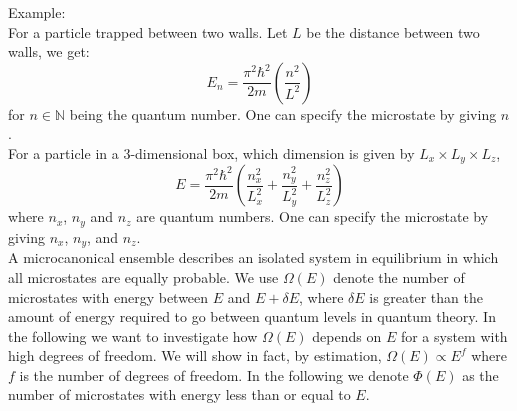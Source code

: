 \documentclass[11pt]{article}
\theoremstyle{break}
\theoremstyle{break}
\newcommand{\N}{\mathbb{N}}
\newcommand{\example}{\color{green}Example: \color{black}}
\begin{document}
\example\\
For a particle trapped between two walls. Let $L$ be the distance between two walls, we get: $$E_n = \frac{\pi^2 \hbar^2}{2m} \left(\frac{n^2}{L^2}\right)$$ for $n \in \N$ being the quantum number. One can specify the microstate by giving $n$. \\
For a particle in a $3$-dimensional box, which dimension is given by $L_x\times L_y\times L_z$, 
$$E = \frac{\pi^2 \hbar^2}{2m}\left(\frac{n_x^2}{L_x^2} + \frac{n_y^2}{L_y^2}+ \frac{n_z^2}{L_z^2}\right) $$
where $n_x$, $n_y$ and $n_z$ are quantum numbers. One can specify the microstate by giving $n_x$, $n_y$, and $n_z$. \\

\hfill\break
\hfill\break
\newpage
A microcanonical ensemble describes an isolated system in equilibrium in which all microstates are equally probable. We use $\Omega(E)$ denote the number of microstates with energy between $E$ and $E+\delta E$, where $\delta E$ is greater than the amount of energy required to go between quantum levels in quantum theory. In the following we want to investigate how $\Omega(E)$ depends on $E$ for a system with high degrees of freedom. We will show in fact, by estimation, $\Omega(E) \propto E^f$ where $f$ is the number of degrees of freedom. In the following we denote $\Phi(E)$ as the number of microstates with energy less than or equal to $E$.\\
\end{document}

